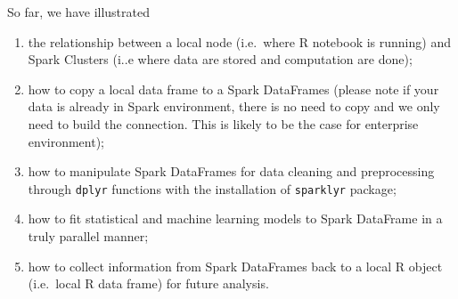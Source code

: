\documentclass[
  12pt,
]{krantz}
\makeatletter
\newenvironment{Shaded}{\begin{snugshade}}{\end{snugshade}}
\newcommand{\AttributeTok}[1]{\textcolor[rgb]{0.61,0.61,0.61}{#1}}
\newcommand{\DecValTok}[1]{\textcolor[rgb]{0.06,0.06,0.06}{#1}}
\newcommand{\FloatTok}[1]{\textcolor[rgb]{0.06,0.06,0.06}{#1}}
\newcommand{\FunctionTok}[1]{\textcolor[rgb]{0,0,0}{#1}}
\newcommand{\NormalTok}[1]{#1}
\newcommand{\SpecialCharTok}[1]{\textcolor[rgb]{0,0,0}{#1}}
\newcommand{\StringTok}[1]{\textcolor[rgb]{0.5,0.5,0.5}{#1}}
\providecommand{\tightlist}{%
  \setlength{\itemsep}{0pt}\setlength{\parskip}{0pt}}
\newenvironment{kframe}{%
\medskip{}
\setlength{\fboxsep}{.8em}
 \def\at@end@of@kframe{}%
 \ifinner\ifhmode%
  \def\at@end@of@kframe{\end{minipage}}%
  \begin{minipage}{\columnwidth}%
 \fi\fi%
 \def\FrameCommand##1{\hskip\@totalleftmargin \hskip-\fboxsep
 \colorbox{shadecolor}{##1}\hskip-\fboxsep
     \hskip-\linewidth \hskip-\@totalleftmargin \hskip\columnwidth}%
 \MakeFramed {\advance\hsize-\width
   \@totalleftmargin\z@ \linewidth\hsize
   \@setminipage}}%
 {\par\unskip\endMakeFramed%
 \at@end@of@kframe}
\renewenvironment{Shaded}{\begin{kframe}}{\end{kframe}}
\makeatother
\begin{document}
\begin{Shaded}
\end{Shaded}

So far, we have illustrated

\begin{enumerate}
\def\labelenumi{\arabic{enumi}.}
\tightlist
\item
  the relationship between a local node (i.e.~where R notebook is running) and Spark Clusters (i..e where data are stored and computation are done);
\item
  how to copy a local data frame to a Spark DataFrames (please note if your data is already in Spark environment, there is no need to copy and we only need to build the connection. This is likely to be the case for enterprise environment);
\item
  how to manipulate Spark DataFrames for data cleaning and preprocessing through \texttt{dplyr} functions with the installation of \texttt{sparklyr} package;
\item
  how to fit statistical and machine learning models to Spark DataFrame in a truly parallel manner;
\item
  how to collect information from Spark DataFrames back to a local R object (i.e.~local R data frame) for future analysis.
\end{enumerate}
\end{document}
